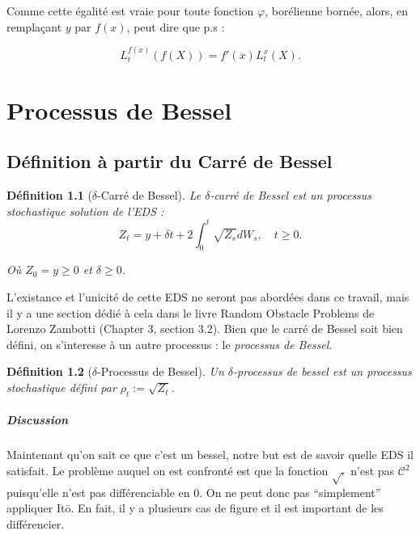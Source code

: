 \documentclass[openany]{book}
\makeatletter
\newcommand{\1}{\mathbbm{1}}
\renewenvironment{proof}[1][\textbf{\textit{Démonstration}}]{%
  \par\pushQED{\qed}%
  \normalfont\topsep6\p@\@plus6\p@\relax
  \trivlist\item[\hskip\labelsep
    #1\@addpunct{.}]\ignorespaces
}{%
  \popQED\endtrivlist\@endpefalse
}
\theoremstyle{thmfont}
\theoremstyle{deffont}
\newtheorem{definition}[definition]{Définition}
\theoremstyle{thmfont}
\theoremstyle{deffont}
\makeatother
\begin{document}
{\begin{proof}
Comme cette égalité est vraie pour toute fonction $\varphi$, borélienne bornée, alors, en remplaçant $y$ par $f(x)$, peut dire que p.s :

$$L_t^{f(x)}(f(X)) =  f'(x) L_t^{x}(X).$$
\end{proof}
}

\chapter{Processus de Bessel}

\section{Définition à partir du Carré de Bessel} 
\begin{definition}[$\delta$-Carré de Bessel] Le \textit{$\delta$-carré de Bessel} est un processus stochastique solution de l'EDS :
  \begin{equation}
    Z_t = y + \delta t + 2 \int_0^t \sqrt{Z_s} dW_s, \quad t\geq0.
    \label{eq:EDSCarreBessel}
  \end{equation}

  Où $Z_0 = y \geq 0$ et $\delta \geq 0$.
\end{definition}

L'existance et l'unicité de cette EDS ne seront pas abordées dans ce travail, mais il y a une section dédié à cela dans le livre Random Obstacle Problems de Lorenzo Zambotti (Chapter 3, section 3.2).
Bien que le carré de Bessel soit bien défini, on s'interesse à un autre processus : le \textit{processus de Bessel}.

\begin{definition}[$\delta$-Processus de Bessel] Un $\delta$-\textit{processus de bessel} est un processus stochastique défini par $\rho_t := \sqrt{Z_t}$.
\end{definition}

\paragraph{Discussion}
Maintenant qu'on sait ce que c'est un bessel, notre but est de savoir quelle EDS il satisfait. Le problème auquel on est confronté est que la fonction $\sqrt{.}$ n'est pas $\mathcal C^2$ puisqu'elle n'est pas différenciable en 0. On ne peut donc pas ``simplement'' appliquer Itō. En fait, il y a plusieurs cas de figure et il est important de les différencier.
\end{document}
